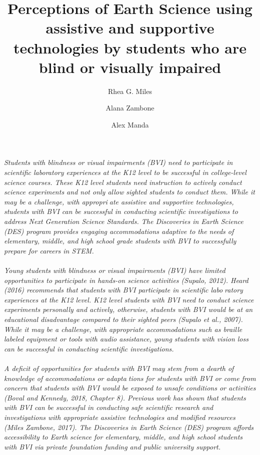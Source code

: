 \documentclass[11pt]{sig-alternate}
\makeatletter
\let\oldabstract\abstract
\let\oldendabstract\endabstract
\renewenvironment{abstract}
{\renewenvironment{quotation}%
               {\list{}{\addtolength{\leftmargin}{1em} %
                        \listparindent 1.5em%
                        \itemindent    \listparindent%
                        \rightmargin   \leftmargin%
                        \parsep        \z@ \@plus\p@}%
                \item\relax}%
               {\endlist}%
\oldabstract}
{\oldendabstract}
\makeatother
\begin{document}
\title{Perceptions of Earth Science using assistive and supportive technologies by students who are blind or visually impaired}

\author[1]{\large \color{blue} Rhea G. Miles}
\author[1]{\large \color{blue} Alana Zambone}
\author[1]{\large \color{blue}   Alex Manda}


\toappear{}

\maketitle
\begin{@twocolumnfalse} 

\begin{abstract}
     \textit{Students with blindness or visual impairments (BVI) need to participate in scientific laboratory experiences at the K12 level to be successful in college-level science courses. These K12 level students need instruction to actively conduct science experiments and not only allow sighted students to conduct them. While it may be a challenge, with appropriate assistive and supportive technologies, students with BVI can be successful in conducting scientific investigations to address Next Generation Science Standards. The Discoveries in Earth Science (DES) program provides engaging accommodations adaptive to the needs of elementary, middle, and high school grade students with BVI to successfully prepare for careers in STEM. \\
     \\
     Young students with blindness or visual impairments (BVI) have limited opportunities to participate in hands-on science activities (Supalo, 2012). Heard (2016) recommends that students with BVI participate in scientific laboratory experiences at the K12 level. K12 level students with BVI need to conduct science experiments personally and actively, otherwise, students with BVI would be at an educational disadvantage compared to their sighted peers (Supalo et al., 2007). While it may be a challenge, with appropriate accommodations such as braille labeled equipment or tools with audio assistance, young students with vision loss can be successful in conducting scientific investigations. \\
     \\
     A deficit of opportunities for students with BVI may stem from a dearth of knowledge of accommodations or adaptations for students with BVI or come from concern that students with BVI would be exposed to unsafe conditions or activities (Boval and Kennedy, 2018, Chapter 8). Previous work has shown that students with BVI can be successful in conducting safe scientific research and investigations with appropriate assistive technologies and modified resources (Miles Zambone, 2017). The Discoveries in Earth Science (DES) program affords accessibility to Earth science for elementary, middle, and high school students with BVI via private foundation funding and public university support.}
\end{abstract}
\end{@twocolumnfalse}
\end{document}
